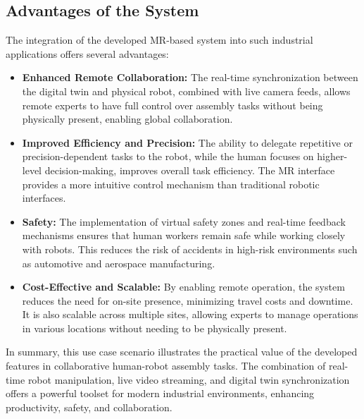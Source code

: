     \subsection{Advantages of the System}
    The integration of the developed \ac{MR}-based system into such industrial applications offers several advantages:
    
    \begin{itemize}
        \item \textbf{Enhanced Remote Collaboration:} The real-time synchronization between the digital twin and physical robot, combined with live camera feeds, allows remote experts to have full control over assembly tasks without being physically present, enabling global collaboration.
        
        \item \textbf{Improved Efficiency and Precision:} The ability to delegate repetitive or precision-dependent tasks to the robot, while the human focuses on higher-level decision-making, improves overall task efficiency. The \ac{MR} interface provides a more intuitive control mechanism than traditional robotic interfaces.
        
        \item \textbf{Safety:} The implementation of virtual safety zones and real-time feedback mechanisms ensures that human workers remain safe while working closely with robots. This reduces the risk of accidents in high-risk environments such as automotive and aerospace manufacturing.
    
        \item \textbf{Cost-Effective and Scalable:} By enabling remote operation, the system reduces the need for on-site presence, minimizing travel costs and downtime. It is also scalable across multiple sites, allowing experts to manage operations in various locations without needing to be physically present.
    
    \end{itemize}
    
    In summary, this use case scenario illustrates the practical value of the developed features in collaborative human-robot assembly tasks. The combination of real-time robot manipulation, live video streaming, and digital twin synchronization offers a powerful toolset for modern industrial environments, enhancing productivity, safety, and collaboration.
    